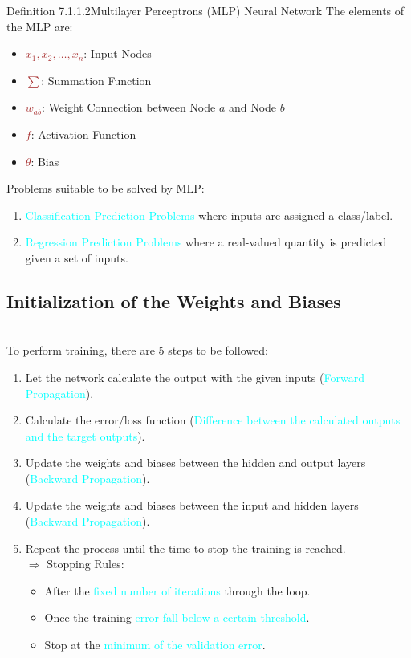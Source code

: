 \documentclass{book}
\begin{document}
\begin{defBox}{Definition 7.1.1.2}{Multilayer Perceptrons (MLP) Neural Network}
    \vspace{3mm}
    The elements of the MLP are:
    \begin{itemize}
        \item \textcolor{brown}{\(x_1, x_2, \ldots, x_n\)}: Input Nodes
        \item \textcolor{brown}{\(\sum\)}: Summation Function
        \item \textcolor{brown}{\(w_{ab}\)}: Weight Connection between Node \(a\) and Node \(b\)
        \item \textcolor{brown}{\(f\)}: Activation Function
        \item \textcolor{brown}{\(\theta\)}: Bias
    \end{itemize}
\end{defBox}
Problems suitable to be solved by MLP:
\begin{enumerate}
    \item \textcolor{cyan}{Classification Prediction Problems} where inputs are assigned a class/label.
    \item \textcolor{cyan}{Regression Prediction Problems} where a real-valued quantity is predicted given a set of inputs.
\end{enumerate}
\newpage
\subsection{Initialization of the Weights and Biases}
\\
\vspace{2mm}
To perform training, there are 5 steps to be followed:
\begin{enumerate}
    \item Let the network calculate the output with the given inputs (\textcolor{cyan}{Forward Propagation}).
    \item Calculate the error/loss function (\textcolor{cyan}{Difference between the calculated outputs and the target outputs}).
    \item Update the weights and biases between the hidden and output layers (\textcolor{cyan}{Backward Propagation}).
    \item Update the weights and biases between the input and hidden layers (\textcolor{cyan}{Backward Propagation}).
    \item Repeat the process until the time to stop the training is reached.\\
    $\Rightarrow$ Stopping Rules:
    \begin{itemize}
        \item After the \textcolor{cyan}{fixed number of iterations} through the loop.
        \item Once the training \textcolor{cyan}{error fall below a certain threshold}.
        \item Stop at the \textcolor{cyan}{minimum of the validation error}.
    \end{itemize}
\end{enumerate}
\end{document}

